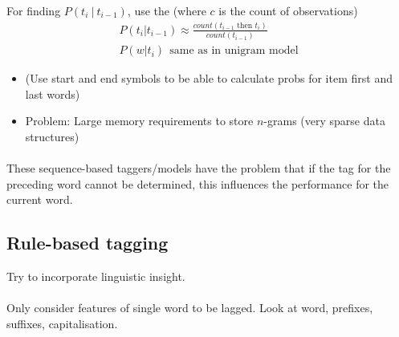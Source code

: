 \documentclass[10pt,twocolumn]{article}
\begin{document}
For finding $P(t_i~|~t_{i-1})$, use the  (where
$c$ is the count of observations)
\begin{align*}
  P(t_i | t_{i-1}) \approx \frac{\mathit{count}(t_{i-1} \text{ then } t_i)}{\mathit{count}(t_{i-1})} \\
  P(w | t_i) ~~ \text{same as in unigram model} 
\end{align*}
\begin{itemize}
\item {(Use start and end symbols to be able to calculate probs for item first
    and last words)}
\item Problem: Large memory requirements to store $n$-grams (very sparse data structures)
\end{itemize}


\paragraph{} These sequence-based taggers/models have the problem that if the
tag for the preceding word cannot be determined, this influences the performance
for the current word.


\subsection{Rule-based tagging}

Try to incorporate linguistic insight.

\paragraph{ } Only consider features of single word to
be lagged. Look at word, prefixes, suffixes, capitalisation.
\end{document}
